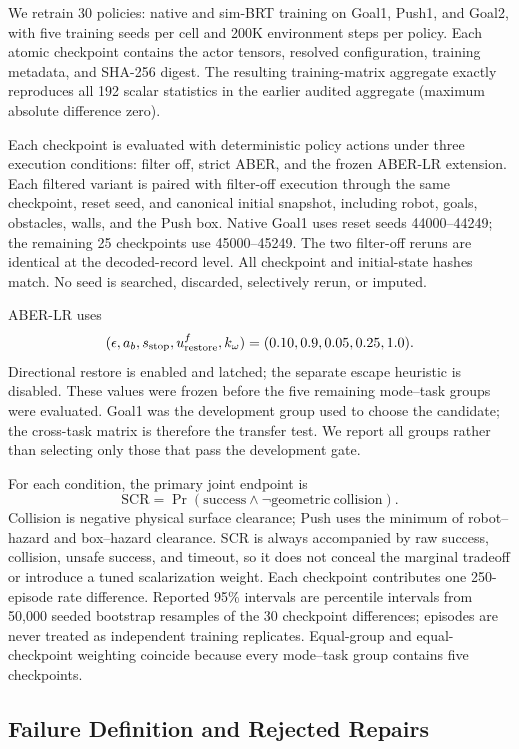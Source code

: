 \documentclass[letterpaper]{article}
\begin{document}
We retrain 30 policies: native and sim-BRT training on Goal1, Push1, and Goal2,
with five training seeds per cell and 200K environment steps per policy.  Each
atomic checkpoint contains the actor tensors, resolved configuration, training
metadata, and SHA-256 digest.  The resulting training-matrix aggregate exactly
reproduces all 192 scalar statistics in the earlier audited aggregate
(maximum absolute difference zero).

Each checkpoint is evaluated with deterministic policy actions under three
execution conditions: filter off, strict ABER, and the frozen ABER-LR
extension.  Each filtered variant is paired with filter-off execution through
the same checkpoint, reset seed, and canonical initial snapshot, including
robot, goals, obstacles, walls, and the Push box.  Native Goal1 uses reset
seeds 44000--44249; the remaining 25 checkpoints use 45000--45249.  The two
filter-off reruns are identical at the decoded-record level.  All checkpoint
and initial-state hashes match.  No seed is searched, discarded, selectively
rerun, or imputed.

ABER-LR uses
\[
(\epsilon,a_b,s_{\rm stop},u^f_{\rm restore},k_\omega)
=(0.10,0.9,0.05,0.25,1.0).
\]
Directional restore is enabled and latched; the separate escape heuristic is
disabled.  These values were frozen before the five remaining mode--task
groups were evaluated.  Goal1 was the development group used to choose the
candidate; the cross-task matrix is therefore the transfer test.  We report
all groups rather than selecting only those that pass the development gate.

For each condition, the primary joint endpoint is
\[
\mathrm{SCR}=\Pr(\mathrm{success}\land
                  \neg\mathrm{geometric\ collision}).
\]
Collision is negative physical surface clearance; Push uses the minimum of
robot--hazard and box--hazard clearance.  SCR is always accompanied by raw
success, collision, unsafe success, and timeout, so it does not conceal the
marginal tradeoff or introduce a tuned scalarization weight.
Each checkpoint contributes one 250-episode rate difference.  Reported 95\%
intervals are percentile intervals from 50,000 seeded bootstrap resamples of
the 30 checkpoint differences; episodes are never treated as independent
training replicates.  Equal-group and equal-checkpoint weighting coincide
because every mode--task group contains five checkpoints.

\subsection{Failure Definition and Rejected Repairs}
\end{document}
